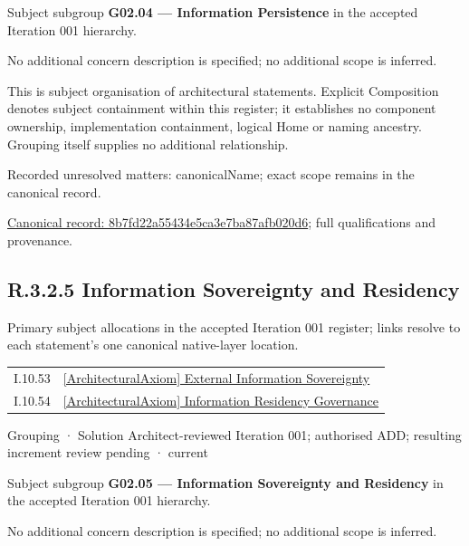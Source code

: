 Subject subgroup \textbf{G02.04 — Information Persistence} in the accepted Iteration 001 hierarchy.



No additional concern description is specified; no additional scope is inferred.



This is subject organisation of architectural statements. Explicit Composition denotes subject containment within this register; it establishes no component ownership, implementation containment, logical Home or naming ancestry. Grouping itself supplies no additional relationship.


{\small Recorded unresolved matters: canonicalName; exact scope remains in the canonical record.}\par
{\footnotesize \href{../../../../continuum/grouping/8b7fd22a55434e5ca3e7ba87afb020d6.md}{Canonical record: 8b7fd22a55434e5ca3e7ba87afb020d6}; full qualifications and provenance.}\par
\subsection*{R.3.2.5 Information Sovereignty and Residency}
\label{navigation:R.3.2.5}

Primary subject allocations in the accepted Iteration 001 register; links resolve to each statement’s one canonical native-layer location.\par
\begin{longtable}{p{.22\linewidth}p{.73\linewidth}}
I.10.53 & \hyperref[element:aa179ef5bdf44b4eab3f2c855a8798d2]{[ArchitecturalAxiom] External Information Sovereignty} \\
I.10.54 & \hyperref[element:349f526a401e4e299b854cbfedad0fca]{[ArchitecturalAxiom] Information Residency Governance} \\
\end{longtable}
\label{element:f4af2b5206264a6fa4c5040324ad272c}
{\small Grouping · Solution Architect-reviewed Iteration 001; authorised ADD; resulting increment review pending · current}\par

Subject subgroup \textbf{G02.05 — Information Sovereignty and Residency} in the accepted Iteration 001 hierarchy.



No additional concern description is specified; no additional scope is inferred.



